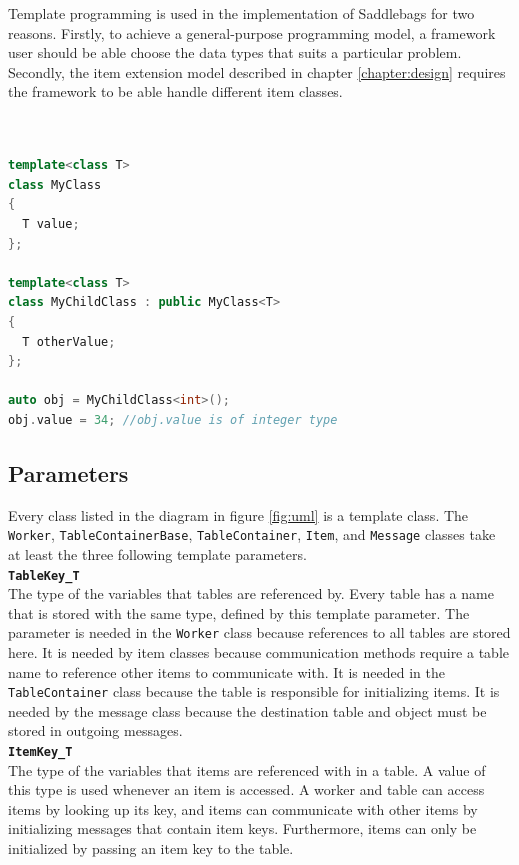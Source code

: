\documentclass{uit-report}
\begin{document}
Template programming is used in the implementation of Saddlebags for two reasons. Firstly, to achieve a general-purpose programming model, a framework user should be able choose the data types that suits a particular problem. Secondly, the item extension model described in chapter \ref{chapter:design} requires the framework to be able handle different item classes.
\\ \\
\begin{lstlisting}[label={lst:template}, float=h,frame=tlrb, caption={Declaration and initialization of an inherited template class in C++}, captionpos=t, language=c++, showstringspaces=false]

template<class T>
class MyClass
{
  T value;
};

template<class T>
class MyChildClass : public MyClass<T>
{
  T otherValue;
};

auto obj = MyChildClass<int>();
obj.value = 34; //obj.value is of integer type
\end{lstlisting}
\newpage
\subsection{Parameters}

Every class listed in the diagram in figure \ref{fig:uml} is a template class. The \texttt{Worker}, \texttt{TableContainerBase}, \texttt{TableContainer}, \texttt{Item}, and \texttt{Message} classes take at least the three following template parameters.
\\

\hspace{4ex} \textbf{\texttt{TableKey\_T}}
\\
The type of the variables that tables are referenced by. Every table has a name that is stored with the same type, defined by this template parameter. The parameter is needed in the \texttt{Worker} class because references to all tables are stored here. It is needed by item classes because communication methods require a table name to reference other items to communicate with. It is needed in the \texttt{TableContainer} class because the table is responsible for initializing items. It is needed by the message class because the destination table and object must be stored in outgoing messages.
\\
 
\hspace{4ex} \textbf{\texttt{ItemKey\_T}}
\\
The type of the variables that items are referenced with in a table. A value of this type is used whenever an item is accessed. A worker and table can access items by looking up its key, and items can communicate with other items by initializing messages that contain item keys. Furthermore, items can only be initialized by passing an item key to the table.
\\
\end{document}
